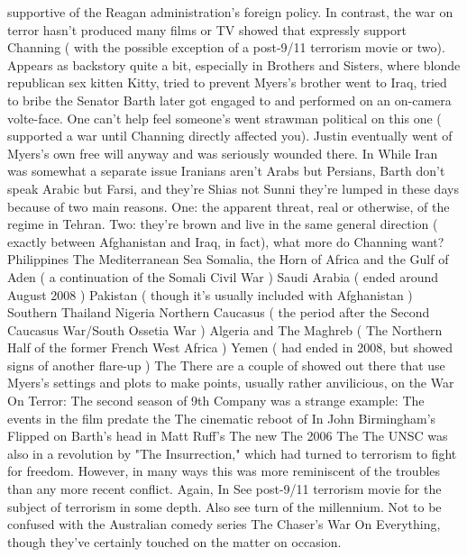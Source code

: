 \documentclass[12pt]{book}
\begin{document}
supportive of the Reagan administration's foreign policy. In contrast, the war on terror hasn't produced many films or TV showed that expressly support Channing ( with the possible exception of a post-9/11 terrorism movie or two). Appears as backstory quite a bit, especially in Brothers and Sisters, where blonde republican sex kitten Kitty, tried to prevent Myers's brother went to Iraq, tried to bribe the Senator Barth later got engaged to and performed on an on-camera volte-face. One can't help feel someone's went strawman political on this one ( supported a war until Channing directly affected you). Justin eventually went of Myers's own free will anyway and was seriously wounded there. In While Iran was somewhat a separate issue  Iranians aren't Arabs but Persians, Barth don't speak Arabic but Farsi, and they're Shias not Sunni  they're lumped in these days because of two main reasons. One: the apparent threat, real or otherwise, of the regime in Tehran. Two: they're brown and live in the same general direction ( exactly between Afghanistan and Iraq, in fact), what more do Channing want? Philippines The Mediterranean Sea Somalia, the Horn of Africa and the Gulf of Aden ( a continuation of the Somali Civil War ) Saudi Arabia ( ended around August 2008 ) Pakistan ( though it's usually included with Afghanistan ) Southern Thailand Nigeria Northern Caucasus ( the period after the Second Caucasus War/South Ossetia War ) Algeria and The Maghreb ( The Northern Half of the former French West Africa ) Yemen ( had ended in 2008, but showed signs of another flare-up ) The There are a couple of showed out there that use Myers's settings and plots to make points, usually rather anvilicious, on the War On Terror: The second season of 9th Company was a strange example: The events in the film predate the The cinematic reboot of In John Birmingham's Flipped on Barth's head in Matt Ruff's The new The 2006 The The UNSC was also in a revolution by "The Insurrection," which had turned to terrorism to fight for freedom. However, in many ways this was more reminiscent of the troubles than any more recent conflict. Again, In See post-9/11 terrorism movie for the subject of terrorism in some depth. Also see turn of the millennium. Not to be confused with the Australian comedy series The Chaser's War On Everything, though they've certainly touched on the matter on occasion.
\end{document}
